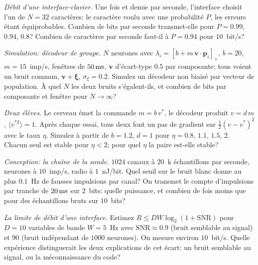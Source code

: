 \begin{exercise}[\lvlB]
\label{ex:17:3}
\emph{Débit d'une interface-clavier.} Une fois et demie par seconde, l'interface choisit l'un de $N=32$ caractères: le caractère voulu avec une probabilité $P$, les erreurs étant équiprobables. Combien de bits par seconde transmet-elle pour $P=0.99$, $0.94$, $0.8$? Combien de caractères par seconde faut-il à $P=0.94$ pour $10$~bit/s?
\end{exercise}

\begin{exercise}[\lvlB]
\label{ex:17:4}
\emph{Simulation: décodeur de groupe.} $N$ neurones avec $\lambda_i=[b+m\,\mathbf v\cdot\mathbf p_i]_+$, $b=20$, $m=15$~imp/s, fenêtres de $50\,\text{ms}$, $\mathbf v$ d'écart-type $0.5$ par composante; tous voient un bruit commun, $\mathbf v+\boldsymbol\xi$, $\sigma_\xi=0.2$. Simulez un décodeur non biaisé par vecteur de population. À quel $N$ les deux bruits s'égalent-ils, et combien de bits par composante et fenêtre pour $N\to\infty$?
\end{exercise}

\begin{exercise}[\lvlB]
\label{ex:17:5}
\emph{Deux élèves.} Le cerveau émet la commande $m=b\,v^*$, le décodeur produit $v=d\,m$, $\langle v^{*2}\rangle=1$. Après chaque essai, tous deux font un pas de gradient sur $\tfrac12(v-v^*)^2$ avec le taux $\eta$. Simulez à partir de $b=1.2$, $d=1$ pour $\eta=0.8$, $1.1$, $1.5$, $2$. Chacun seul est stable pour $\eta<2$; pour quel $\eta$ la paire est-elle stable?
\end{exercise}

\begin{exercise}[\lvlB]
\label{ex:17:6}
\emph{Conception: la chaîne de la sonde.} $1024$ canaux à $20$~k échantillons par seconde, neurones à $10$~imp/s, radio à $1$~nJ/bit. Quel seuil sur le bruit blanc donne au plus $0.1$~Hz de fausses impulsions par canal? On transmet le compte d'impulsions par tranche de $20\,\text{ms}$ sur $2$~bits: quelle puissance, et combien de fois moins que pour des échantillons bruts sur $10$~bits?
\end{exercise}

\begin{exercise}[\lvlC]
\label{ex:17:7}
\emph{La limite de débit d'une interface.} Estimez $R\le DW\log_2(1+\text{SNR})$ pour $D=10$ variables de bande $W=5$~Hz avec $\text{SNR}\approx0.9$ (bruit semblable au signal) et $90$ (bruit indépendant de $1000$ neurones). On mesure environ $10$~bit/s. Quelle expérience distinguerait les deux explications de cet écart: un bruit semblable au signal, ou la méconnaissance du code?
\end{exercise}
